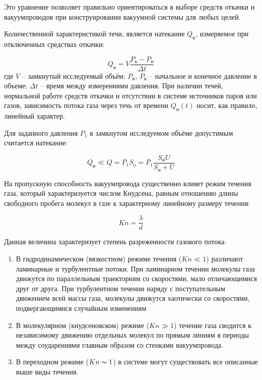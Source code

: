 \documentclass[12pt,a4paper]{article}
\begin{document}
Это уравнение позволяет правильно ориентироваться в выборе средств
откачки и вакуумпроводов при конструировании вакуумной системы для
любых целей.

Количественной характеристикой течи, является натекание $Q_{\text{н}}$, измеряемое при отключенных средствах откачки:

\begin{equation}
	Q_{\text{н}} = V \frac{P_{\text{к}} - P_{\text{н}}}{\Delta t}
\end{equation}
где $V$ -- замкнутый исследуемый объём; $P_{\text{н}}$, $P_{\text{к}}$ -- начальное и конечное давление в объеме; $\Delta t$ -- время между измерениями давления. При наличии течей, нормальной работе средств откачки и отсутствии в системе
источников паров или газов, зависимость потока газа через течь от времени $Q_{\text{н}}(t)$ носит, как правило, линейный характер.

Для заданного давления $P_1$ в замкнутом исследуемом объёме допустимым считается натекание:

\begin{equation}
	Q_{\text{н}} \ll Q = P_1 S_{\text{o}} = P_1 \frac{S_{\text{н}} U}{S_{\text{н}} + U}
\end{equation}

На пропускную способность вакуумпровода существенно влияет
режим течения газа, который характеризуется числом Кнудсена, равным
отношению длины свободного пробега молекул в газе к характерному
линейному размеру течения:

\begin{equation}
	Kn = \frac{\lambda}{d}
\end{equation}

Данная величина характеризует степень разреженности газового
потока:
\begin{enumerate}
	
	\item В гидродинамическом (вязкостном) режиме течения ($Kn \ll 1$)
	различают ламинарные и турбулентные потоки. При ламинарном
	течении молекулы газа движутся по параллельным траекториям
	со скоростями, мало отличающимися друг от друга. При турбулентном течении наряду с поступательным движением всей массы газа, молекулы движутся хаотически со скоростями, подвергающимися случайным изменениям
	
	\item В молекулярном (кнудсеновском) режиме ($Kn \gg 1$) течение газа
	сводится к независимому движению отдельных молекул по прямым линиям в периоды между соударениями главным образом со
	стенками вакуумпровода.
	
	\item В переходном режиме ($Kn \thicksim 1$) в системе могут существовать все
	описанные выше виды течения.
	
\end{enumerate}
\end{document}
